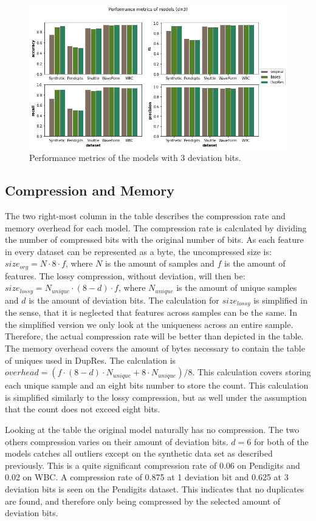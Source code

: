 \begin{figure}
  \centering
  \includegraphics[width=\linewidth]{images/performance_metrics.png}
  \caption{Performance metrics of the models with 3 deviation bits. }
  \label{fig:performance_metrics}
\end{figure}
\subsection{Compression and Memory}
The two right-most column in the table describes the compression rate and memory overhead for each model. The compression rate is calculated by dividing the number of compressed bits with the original number of bits. As each feature in every dataset can be represented as a byte, the uncompressed size is: $size_{org} = N \cdot 8 \cdot f $, where $N$ is the amount of samples and $f$ is the amount of features. The lossy compression, without deviation, will then be: $size_{lossy}=N_{unique} \cdot (8-d) \cdot f$, where $N_{unique}$ is the amount of unique samples and $d$ is the amount of deviation bits. The calculation for $size_{lossy}$ is simplified in the sense, that it is neglected that features across samples can be the same. In the simplified version we only look at the uniqueness across an entire sample. Therefore, the actual compression rate will be better than depicted in the table. The memory overhead covers the amount of bytes necessary to contain the table of uniques used in DupRes. The calculation is $overhead = (f \cdot (8-d) \cdot N_{unique} + 8 \cdot N_{unique})/8$. This calculation covers storing each unique sample and an eight bits number to store the count. This calculation is simplified similarly to the lossy compression, but as well under the assumption that the count does not exceed eight bits.

Looking at the table the original model naturally has no compression. The two others compression varies on their amount of deviation bits. $d=6$ for both of the models catches all outliers except on the synthetic data set as described previously. This is a quite significant compression rate of 0.06 on Pendigits and 0.02 on WBC. A compression rate of 0.875 at 1 deviation bit and 0.625 at 3 deviation bits is seen on the Pendigits dataset. This indicates that no duplicates are found, and therefore only being compressed by the selected amount of deviation bits. 

